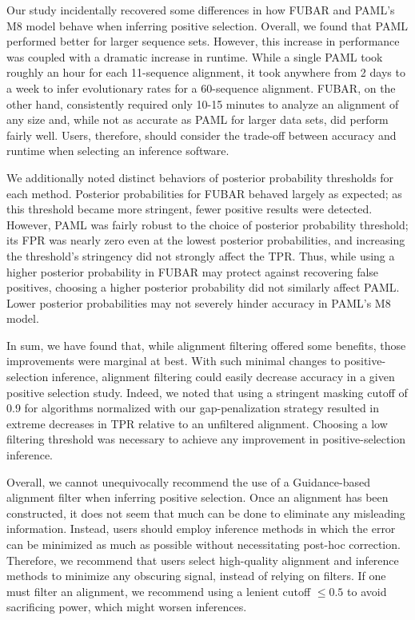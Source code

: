\documentclass[10pt]{article}
\begin{document}
Our study incidentally recovered some differences in how FUBAR and PAML's M8 model behave when inferring positive selection. Overall, we found that PAML performed better for larger sequence sets. However, this increase in performance was coupled with a dramatic increase in runtime. While a single PAML took roughly an hour for each 11-sequence alignment, it took anywhere from 2 days to a week to infer evolutionary rates for a 60-sequence alignment. FUBAR, on the other hand, consistently required only 10-15 minutes to analyze an alignment of any size and, while not as accurate as PAML for larger data sets, did perform fairly well. Users, therefore, should consider the trade-off between accuracy and runtime when selecting an inference software. 

We additionally noted distinct behaviors of posterior probability thresholds for each method. Posterior probabilities for FUBAR behaved largely as expected; as this threshold became more stringent, fewer positive results were detected. However, PAML was fairly robust to the choice of posterior probability threshold; its FPR was nearly zero even at the lowest posterior probabilities, and increasing the threshold's stringency did not strongly affect the TPR. Thus, while using a higher posterior probability in FUBAR may protect against recovering false positives, choosing a higher posterior probability did not similarly affect PAML. Lower posterior probabilities may not severely hinder accuracy in PAML's M8 model.
 
In sum, we have found that, while alignment filtering offered some benefits, those improvements were marginal at best. With such minimal changes to positive-selection inference, alignment filtering could easily decrease accuracy in a given positive selection study. Indeed, we noted that using a stringent masking cutoff of 0.9 for algorithms normalized with our gap-penalization strategy resulted in extreme decreases in TPR relative to an unfiltered alignment. Choosing a low filtering threshold was necessary to achieve any improvement in positive-selection inference.  

Overall, we cannot unequivocally recommend the use of a Guidance-based alignment filter when inferring positive selection. Once an alignment has been constructed, it does not seem that much can be done to eliminate any misleading information. Instead, users should employ inference methods in which the error can be minimized as much as possible without necessitating post-hoc correction. Therefore, we recommend that users select high-quality alignment and inference methods to minimize any obscuring signal, instead of relying on filters. If one must filter an alignment, we recommend using a lenient cutoff $\leq0.5$ to avoid sacrificing power, which might worsen inferences.
\end{document}
